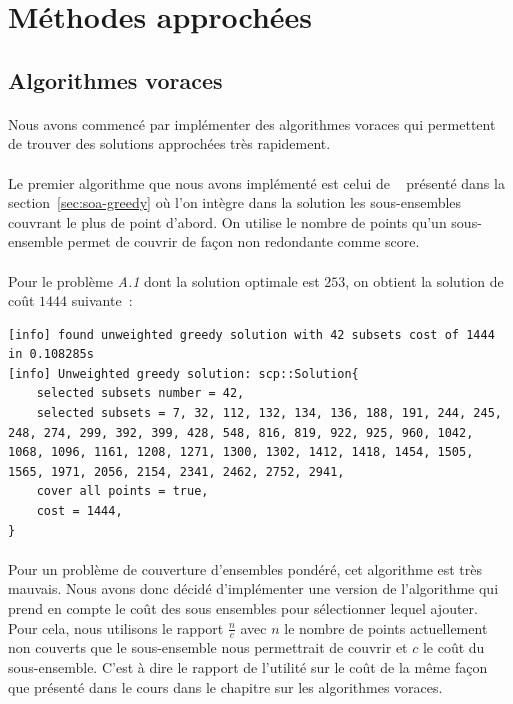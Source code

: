 \documentclass[12pt,letterpaper,twoside]{article}
\begin{document}
	\section{Méthodes approchées}
		\subsection{Algorithmes voraces}\label{sec:approx-greedy}
			\paragraph*{}
				Nous avons commencé par implémenter des algorithmes voraces qui permettent de trouver des solutions approchées très rapidement.
			\paragraph*{}
				Le premier algorithme que nous avons implémenté est celui de
				\citeauthor{Johnson:1973:AAC:800125.804034}~\cite{Johnson:1973:AAC:800125.804034} présenté dans la section~\ref{sec:soa-greedy}
				où l'on intègre dans la solution les sous-ensembles couvrant le plus de point d'abord.
				On utilise le nombre de points qu'un sous-ensemble permet de couvrir de façon non redondante comme score.
			\paragraph*{}
				Pour le problème \emph{A.1} dont la solution optimale est \(253\), on obtient la solution de coût \(1444\) suivante :
			\begin{lstlisting}
[info] found unweighted greedy solution with 42 subsets cost of 1444 in 0.108285s
[info] Unweighted greedy solution: scp::Solution{
	selected subsets number = 42,
	selected subsets = 7, 32, 112, 132, 134, 136, 188, 191, 244, 245, 248, 274, 299, 392, 399, 428, 548, 816, 819, 922, 925, 960, 1042, 1068, 1096, 1161, 1208, 1271, 1300, 1302, 1412, 1418, 1454, 1505, 1565, 1971, 2056, 2154, 2341, 2462, 2752, 2941,
	cover all points = true,
	cost = 1444,
}\end{lstlisting}
			\paragraph*{}
				Pour un problème de couverture d'ensembles pondéré, cet algorithme est très mauvais.
				Nous avons donc décidé d'implémenter une version de l'algorithme qui prend en compte le coût des sous ensembles pour
				sélectionner lequel ajouter.
				Pour cela, nous utilisons le rapport \(\frac{n}{c}\) avec \(n\) le nombre de points actuellement non couverts que le
				sous-ensemble nous permettrait de couvrir et \(c\) le coût du sous-ensemble. C'est à dire le rapport de l'utilité sur
				le coût de la même façon que présenté dans le cours dans le chapitre sur les algorithmes voraces.
\end{document}
